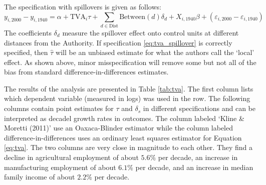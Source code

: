 \documentclass[11pt]{article}
\begin{document}
The specification with spillovers is given as follows:  
\begin{equation}\label{eq:tva_spillover}
    y_{i, 2000} - y_{i, 1940} = \alpha + \text{TVA}_i \tau + \sum_{d \in \text{Dist}} \text{Between}(d)\delta_d + X_{i, 1940} \beta + (\varepsilon_{i, 2000} - \varepsilon_{i, 1940})
\end{equation} 
The coefficients $\delta_d$ measure the spillover effect onto control units at different distances from the Authority. If specification \ref{eq:tva_spillover} is correctly specified, then $\hat{\tau}$ will be an unbiased estimate for what the authors call the `local' effect. As shown above, minor misspecification will remove some but not all of the bias from standard difference-in-differences estimates. 

The results of the analysis are presented in Table \ref{tab:tva}. The first column lists which dependent variable (measured in logs) was used in the row. The following columns contain point estimates for $\tau$ and $\delta_s$ in different specifications and can be interpreted as decadel growth rates in outcomes. The column labeled `Kline \& Moretti (2011)' use an Oaxaca-Blinder estimator while the column labeled difference-in-differences uses an ordinary least squares estimator for Equation \ref{eq:tva}. The two columns are very close in magnitude to each other. They find a decline in agricultural employment of about $5.6\%$ per decade, an increase in manufacturing employment of about $6.1\%$ per decade, and an increase in median family income of about $2.2\%$ per decade. 
\end{document}
